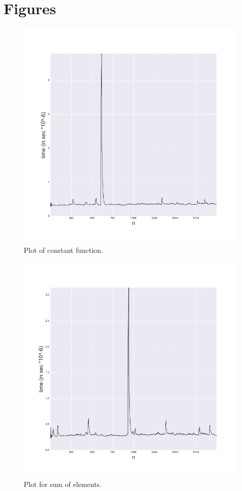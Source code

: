 \documentclass[a4paper,article,14pt]{extarticle}
\begin{document}
	\section{Figures}
	\begin{figure}[h]
		\centering
		\includegraphics[scale=0.5]{constant.png}
		\caption{Plot of constant function.}
		\label{constant}
	\end{figure} 
	\begin{figure}[h]
		\centering
		\includegraphics[scale=0.5]{sumOfVector.png}
		\caption{Plot for sum of elements.}
		\label{sum}
	\end{figure} 
\end{document}
